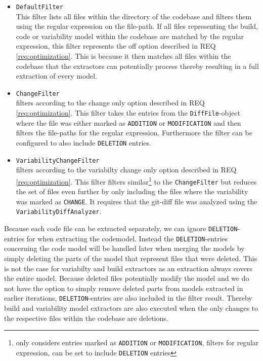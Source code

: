 \documentclass[a4paper]{article}
\begin{document}
\begin{itemize}
\item \texttt{DefaultFilter} \\
    This filter lists all files within the directory of the codebase and filters them using the regular expression on the file-path. If all files representing the build, code or variability model within the codebase are matched by the regular expression, this filter represents the off option described in REQ \ref{req:optimization}. This is because it then matches all files within the codebase that the extractors can potentially process thereby resulting in a full extraction of every model.
\item \texttt{ChangeFilter} \\
    filters according to the change only option described in REQ \ref{req:optimization}. This filter takes the entries from the \texttt{DiffFile}-object where the file was either marked as \texttt{ADDITION} or \texttt{MODIFICATION} and then filters the file-paths for the regular expression. Furthermore the filter can be configured to also include \texttt{DELETION} entries.
\item \texttt{VariabilityChangeFilter} \\
    filters according to the variabilty change only option described in REQ \ref{req:optimization}. This filter filters similar\footnote{only considers entries marked as \texttt{ADDITION} or \texttt{MODIFICATION}, filters for regular expression, can be set to include \texttt{DELETION} entries} to the \texttt{ChangeFilter}  but reduces the set of files even further by only including the files where the variability was marked as \texttt{CHANGE}. It requires that the git-diff file was analyzed using the \texttt{Variability\-Diff\-Analyzer}.
\end{itemize}

Because each code file can be extracted separately, we can ignore \texttt{DELETION}-entries for when extracting the codemodel. Instead the \texttt{DELETION}-entries concerning the code model will be handled later when merging the models by simply deleting the parts of the model that represent files that were deleted. This is not the case for variabilty and build extractors as an extraction always covers the entire model. Because deleted files potentially modify the model and we do not have the option to simply remove deleted parts from models extracted in earlier iterations, \texttt{DELETION}-entries are also included in the filter result. Thereby  build and variability model extractors are also executed when the only changes to the respective files within the codebase are deletions.
\end{document}

